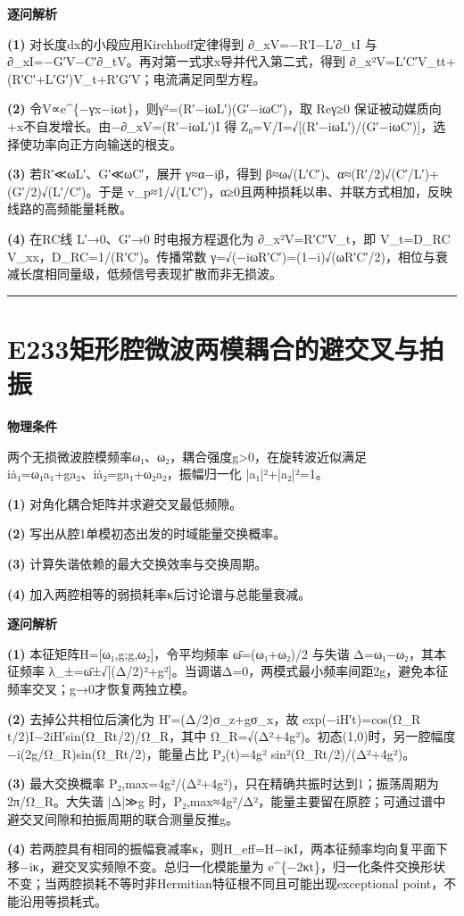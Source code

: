\documentclass[UTF8,a4paper,11pt,oneside,openany]{ctexbook}
\begin{document}
\par\medskip\noindent\textbf{逐问解析}
\par\noindent\textbf{(1)} 对长度dx的小段应用Kirchhoff定律得到 ∂\_xV=−R′I−L′∂\_tI 与 ∂\_xI=−G′V−C′∂\_tV。再对第一式求x导并代入第二式，得到 ∂\_x²V=L′C′V\_tt+(R′C′+L′G′)V\_t+R′G′V；电流满足同型方程。
\par\noindent\textbf{(2)} 令V∝e\textasciicircum{}\{−γx−iωt\}，则γ²=(R′−iωL′)(G′−iωC′)，取 Reγ≥0 保证被动媒质向+x不自发增长。由−∂\_xV=(R′−iωL′)I 得 Z₀=V/I=√[(R′−iωL′)/(G′−iωC′)]，选择使功率向正方向输送的根支。
\par\noindent\textbf{(3)} 若R′≪ωL′、G′≪ωC′，展开 γ≈α−iβ，得到 β≈ω√(L′C′)、α≈(R′/2)√(C′/L′)+(G′/2)√(L′/C′)。于是 v\_p≈1/√(L′C′)，α≥0且两种损耗以串、并联方式相加，反映线路的高频能量耗散。
\par\noindent\textbf{(4)} 在RC线 L′→0、G′→0 时电报方程退化为 ∂\_x²V=R′C′V\_t，即 V\_t=D\_RC V\_xx，D\_RC=1/(R′C′)。传播常数 γ=√(−iωR′C′)=(1−i)√(ωR′C′/2)，相位与衰减长度相同量级，低频信号表现扩散而非无损波。

\par\bigskip\hrule\bigskip
\section*{E233\quad 矩形腔微波两模耦合的避交叉与拍振}
\textbf{物理条件}\par 两个无损微波腔模频率ω₁、ω₂，耦合强度g>0，在旋转波近似满足 iȧ₁=ω₁a₁+ga₂、iȧ₂=ga₁+ω₂a₂，振幅归一化 |a₁|²+|a₂|²=1。
\par\noindent\textbf{(1)} 对角化耦合矩阵并求避交叉最低频隙。
\par\noindent\textbf{(2)} 写出从腔1单模初态出发的时域能量交换概率。
\par\noindent\textbf{(3)} 计算失谐依赖的最大交换效率与交换周期。
\par\noindent\textbf{(4)} 加入两腔相等的弱损耗率κ后讨论谱与总能量衰减。

\par\medskip\noindent\textbf{逐问解析}
\par\noindent\textbf{(1)} 本征矩阵H=[ω₁,g;g,ω₂]，令平均频率 ω̄=(ω₁+ω₂)/2 与失谐 Δ=ω₁−ω₂，其本征频率 λ\_±=ω̄±√[(Δ/2)²+g²]。当调谐Δ=0，两模式最小频率间距2g，避免本征频率交叉；g→0才恢复两独立模。
\par\noindent\textbf{(2)} 去掉公共相位后演化为 H′=(Δ/2)σ\_z+gσ\_x，故 exp(−iH′t)=cos(Ω\_R t/2)I−2iH′sin(Ω\_Rt/2)/Ω\_R，其中 Ω\_R=√(Δ²+4g²)。初态(1,0)时，另一腔幅度 −i(2g/Ω\_R)sin(Ω\_Rt/2)，能量占比 P₂(t)=4g² sin²(Ω\_Rt/2)/(Δ²+4g²)。
\par\noindent\textbf{(3)} 最大交换概率 P₂,max=4g²/(Δ²+4g²)，只在精确共振时达到1；振荡周期为 2π/Ω\_R。大失谐 |Δ|≫g 时，P₂,max≈4g²/Δ²，能量主要留在原腔；可通过谱中避交叉间隙和拍振周期的联合测量反推g。
\par\noindent\textbf{(4)} 若两腔具有相同的振幅衰减率κ，则H\_eff=H−iκI，两本征频率均向复平面下移−iκ，避交叉实频隙不变。总归一化模能量为 e\textasciicircum{}\{−2κt\}，归一化条件交换形状不变；当两腔损耗不等时非Hermitian特征根不同且可能出现exceptional point，不能沿用等损耗式。
\end{document}
